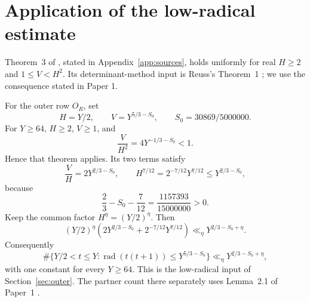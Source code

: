 \section{Application of the low-radical estimate}\label{app:lowrad}

Theorem~3 of \cite{Paper1}, stated in Appendix~\ref{app:sources},
holds uniformly for real $H\ge2$ and $1\le V<H^2$.
Its determinant-method input is Reuss's Theorem~1 \cite{Reuss}; we use
the consequence stated in Paper 1.

For the outer row $O_R$, set
\[
 H=Y/2,\qquad V=Y^{5/3-S_0},\qquad
 S_0=30869/5000000.
\]
For $Y\ge64$, $H\ge2$, $V\ge1$, and
\[
 \frac{V}{H^2}=4Y^{-1/3-S_0}<1.
\]
Hence that theorem applies. Its two terms satisfy
\[
 \frac VH=2Y^{2/3-S_0},\qquad
 H^{7/12}=2^{-7/12}Y^{7/12}
 \le Y^{2/3-S_0},
\]
because
\[
 \frac23-S_0-\frac7{12}
 =\frac{1157393}{15000000}>0.
\]
Keep the common factor \(H^\eta=(Y/2)^\eta\). Then
\[
 (Y/2)^\eta\left(2Y^{2/3-S_0}
       +2^{-7/12}Y^{7/12}\right)
 \ll_\eta Y^{2/3-S_0+\eta}.
\]
Consequently
\[
 \#\{Y/2<t\le Y:\operatorname{rad}(t(t+1))\le Y^{5/3-S_0}\}
 \ll_\eta Y^{2/3-S_0+\eta},
\]
with one constant for every $Y\ge64$. This is the low-radical input of
Section~\ref{sec:outer}. The partner count there separately uses
Lemma~2.1 of Paper~1 \cite{Paper1}.

